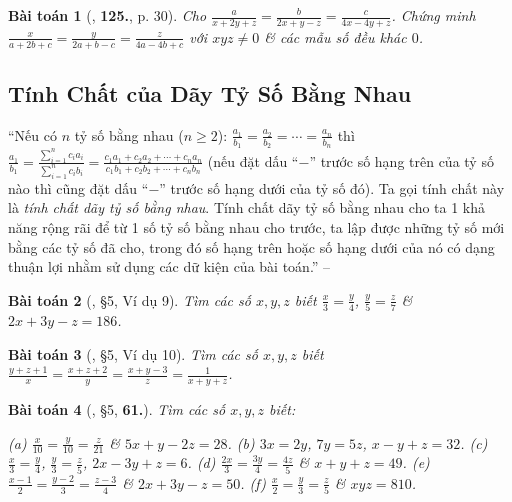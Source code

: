 \documentclass{article}
\newtheorem{baitoan}{Bài toán}
\begin{document}
\begin{baitoan}[\cite{Tuyen_Toan_7}, \textbf{125.}, p. 30]
	Cho $\frac{a}{x + 2y + z} = \frac{b}{2x + y - z} = \frac{c}{4x - 4y + z}$. Chứng minh $\frac{x}{a + 2b + c} = \frac{y}{2a + b - c} = \frac{z}{4a - 4b + c}$ với $xyz\ne 0$ \& các mẫu số đều khác $0$.
\end{baitoan}


\subsection{Tính Chất của Dãy Tỷ Số Bằng Nhau}
``Nếu có $n$ tỷ số bằng nhau ($n\ge 2$): $\frac{a_1}{b_1} = \frac{a_2}{b_2} = \cdots = \frac{a_n}{b_n}$ thì $\frac{a_1}{b_1} = \frac{\sum_{i=1}^n c_ia_i}{\sum_{i=1}^n c_ib_i} = \frac{c_1a_1 + c_2a_2 + \cdots + c_na_n}{c_1b_1 + c_2b_2 + \cdots + c_nb_n}$ (nếu đặt dấu ``$-$'' trước số hạng trên của tỷ số nào thì cũng đặt dấu ``$-$'' trước số hạng dưới của tỷ số đó). Ta gọi tính chất này là \textit{tính chất dãy tỷ số bằng nhau}. Tính chất dãy tỷ số bằng nhau cho ta 1 khả năng rộng rãi để từ 1 số tỷ số bằng nhau cho trước, ta lập được những tỷ số mới bằng các tỷ số đã cho, trong đó số hạng trên hoặc số hạng dưới của nó có dạng thuận lợi nhằm sử dụng các dữ kiện của bài toán.'' -- \cite[\S5]{Binh_Toan_7_tap_1}

\begin{baitoan}[\cite{Binh_Toan_7_tap_1}, \S5, Ví dụ 9]
	Tìm các số $x,y,z$ biết $\frac{x}{3} = \frac{y}{4}$, $\frac{y}{5} = \frac{z}{7}$ \& $2x + 3y - z = 186$.
\end{baitoan}

\begin{baitoan}[\cite{Binh_Toan_7_tap_1}, \S5, Ví dụ 10]
	Tìm các số $x,y,z$ biết $\frac{y + z + 1}{x} = \frac{x + z + 2}{y} = \frac{x + y - 3}{z} = \frac{1}{x + y + z}$.
\end{baitoan}

\begin{baitoan}[\cite{Binh_Toan_7_tap_1}, \S5, \textbf{61.}]
	Tìm các số $x,y,z$ biết:
	
		(a) $\frac{x}{10} = \frac{y}{10} = \frac{z}{21}$ \& $5x + y - 2z = 28$.
		(b) $3x = 2y$, $7y = 5z$, $x - y + z = 32$.
		(c) $\frac{x}{3} = \frac{y}{4}$, $\frac{y}{3} = \frac{z}{5}$, $2x - 3y + z = 6$.
		(d) $\frac{2x}{3} = \frac{3y}{4} = \frac{4z}{5}$ \& $x + y + z = 49$.
		(e) $\frac{x - 1}{2} = \frac{y - 2}{3} = \frac{z - 3}{4}$ \& $2x + 3y - z = 50$.
		(f) $\frac{x}{2} = \frac{y}{3} = \frac{z}{5}$ \& $xyz = 810$.
	
\end{baitoan}
\end{document}
